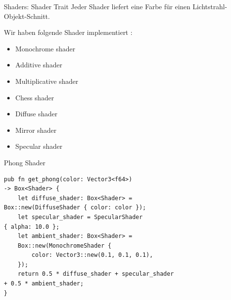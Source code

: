 \documentclass[aspectratio=169]{beamer}
\begin{document}
\begin{frame}[fragile]{Shaders: Shader Trait}
    Jeder Shader liefert eine Farbe für einen Lichtstrahl-Objekt-Schnitt.

    \pause
    Wir haben folgende Shader implementiert :

    \begin{itemize}[<+->]
        \item Monochrome shader
        \item Additive shader
        \item Multiplicative shader
        \item Chess shader
        \item Diffuse shader
        \item Mirror shader
        \item Specular shader
    \end{itemize}
\end{frame}
\begin{frame}[fragile]{Phong Shader}
    \begin{lstlisting}
pub fn get_phong(color: Vector3<f64>)
-> Box<Shader> {
    let diffuse_shader: Box<Shader> =
Box::new(DiffuseShader { color: color });
    let specular_shader = SpecularShader
{ alpha: 10.0 };
    let ambient_shader: Box<Shader> =
    Box::new(MonochromeShader {
        color: Vector3::new(0.1, 0.1, 0.1),
    });
    return 0.5 * diffuse_shader + specular_shader
+ 0.5 * ambient_shader;
}
    \end{lstlisting}
\end{frame}
\end{document}
